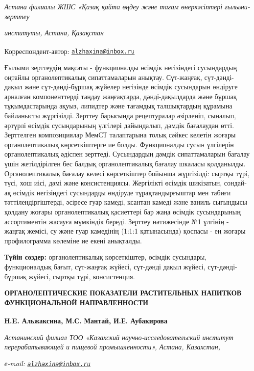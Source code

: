 {\emph{Астана филиалы ЖШС «Қазақ қайта өңдеу және тағам өнеркәсіптері
ғылыми-зерттеу}

\emph{институты, Астана, Қазақстан}

{\bfseries \textsuperscript{\envelope }}Корреспондент-автор:
\href{mailto:alzhaxina@inbox.ru}{\nolinkurl{alzhaxina@inbox.ru}}

Ғылыми зерттеудің мақсаты - функционалды өсімдік негізіндегі сусындардың
оңтайлы органолептикалық сипаттамаларын анықтау. Сүт-жаңғақ,
сүт-дәнді-дақыл және сүт-дәнді-бұршақ жүйелер негізінде өсімдік
сусындарын өндіруге арналған компоненттерді таңдау жаңғақтарда,
дәнді-дақылдарда және бұршақ тұқымдастарында ақуыз, липидтер және
тағамдық талшықтардың құрамына байланысты жүргізілді. Зерттеу барысында
рецептуралар әзірленіп, сыналып, әртүрлі өсімдік сусындарының үлгілері
дайындалып, дәмдік бағалаудан өтті. Зерттелген композициялар МемСТ
талаптарына толық сәйкес келетін жоғары органолептикалық көрсеткіштерге
ие болды. Функционалды сусын үлгілерін органолептикалық әдіспен
зерттеді. Сусындардың дәмдік сипаттамаларын бағалау үшін жетілдірілген
бес балдық органолептикалық бағалау шкаласы қолданылды. Органолептикалық
бағалау келесі көрсеткіштер бойынша жүргізілді: сыртқы түрі, түсі, хош
иісі, дәмі және консистенциясы. Жергілікті өсімдік шикізатын, сондай-ақ
өсімдік негізіндегі сусындарды өндіруде тұрақтандырғыштар мен табиғи
тәттілендіргіштерді, әсіресе гуар камеді, ксантан камеді және ваниль
сығындысы қолдану жоғары органолептикалық қасиеттері бар жаңа өсімдік
сусындарының ассортиментін жасауға мүмкіндік береді. Зерттеу нәтижесінде
№1 үлгінің - жаңғақ жемісі, су және гуар камедінің (1:1:1 қатынасында)
қоспасы - ең жоғары профилограмма көлеміне ие екені анықталды.

{\bfseries Түйін сөздер:} органолептикалық көрсеткіштер, өсімдік сусындары,
функционалдық бағыт, сүт-жаңғақ жүйесі, сүт-дәнді дақыл жүйесі,
сүт-дәнді-бұршақ жүйесі, сыртқы түрі, консистенция.

{\bfseries ОРГАНОЛЕПТИЧЕСКИЕ ПОКАЗАТЕЛИ РАСТИТЕЛЬНЫХ НАПИТКОВ
ФУНКЦИОНАЛЬНОЙ НАПРАВЛЕННОСТИ}

{\bfseries Н.E. Альжаксина\textsuperscript{\envelope }, М.С. Мантай, И.Е.
Аубакирова}

\emph{Астанинский филиал ТОО «Казахский научно-исследовательский
институт перерабатывающей и пищевой промышленности», Астана, Казахстан,}

\emph{е-mail:
\href{mailto:alzhaxina@inbox.ru}{\nolinkurl{alzhaxina@inbox.ru}}}

}
